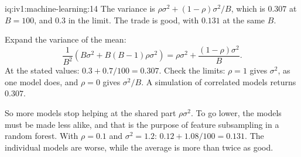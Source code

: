 \begin{solution}{iq:iv1:machine-learning:14}
The variance is $\rho\sigma^2 + (1 - \rho)\sigma^2/B$, which is $0.307$ at $B = 100$, and $0.3$ in the limit. The trade is good, with $0.131$ at the same $B$.

Expand the variance of the mean:
\[
\frac{1}{B^2}\left(B\sigma^2 + B(B - 1)\rho\sigma^2\right) = \rho\sigma^2 + \frac{(1 - \rho)\sigma^2}{B}.
\]
At the stated values: $0.3 + 0.7/100 = 0.307$. Check the limits: $\rho = 1$ gives $\sigma^2$, as one model does, and $\rho = 0$ gives $\sigma^2/B$. A simulation of correlated models returns $0.307$.

So more models stop helping at the shared part $\rho\sigma^2$. To go lower, the models must be made less alike, and that is the purpose of feature subsampling in a random forest. With $\rho = 0.1$ and $\sigma^2 = 1.2$: $0.12 + 1.08/100 = 0.131$. The individual models are worse, while the average is more than twice as good.



\end{solution}

